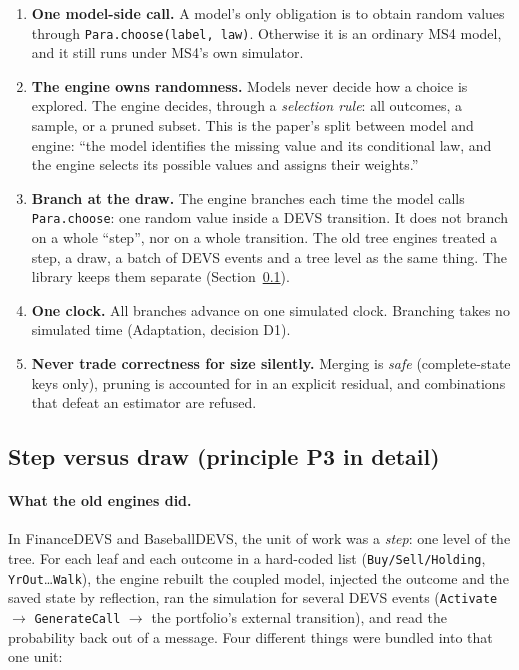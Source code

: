 \documentclass[11pt]{article}
\newcommand{\code}[1]{\texttt{#1}}
\begin{document}
\begin{enumerate}[label=\textbf{P\arabic*.}]
\item \textbf{One model-side call.} A model's only obligation is to obtain random values through
  \code{Para.choose(label, law)}. Otherwise it is an ordinary MS4 model, and it still runs under MS4's own simulator.
\item \textbf{The engine owns randomness.} Models never decide how a choice is explored. The engine decides,
  through a \emph{selection rule}: all outcomes, a sample, or a pruned subset. This is the paper's split between model
  and engine: ``the model identifies the missing value and its conditional law, and the engine selects its possible
  values and assigns their weights.''
\item \textbf{Branch at the draw.} The engine branches each time the model calls \code{Para.choose}: one random value
  inside a DEVS transition. It does not branch on a whole ``step'', nor on a whole transition. The old tree engines
  treated a step, a draw, a batch of DEVS events and a tree level as the same thing. The library keeps them separate
  (Section~\ref{sec:stepdraw}).
\item \textbf{One clock.} All branches advance on one simulated clock. Branching takes no simulated time
  (Adaptation, decision D1).
\item \textbf{Never trade correctness for size silently.} Merging is \emph{safe} (complete-state keys only),
  pruning is accounted for in an explicit residual, and combinations that defeat an estimator are refused.
\end{enumerate}

\subsection{Step versus draw (principle P3 in detail)}
\label{sec:stepdraw}

\paragraph{What the old engines did.} In FinanceDEVS and BaseballDEVS, the unit of work was a \emph{step}: one level
of the tree. For each leaf and each outcome in a hard-coded list (\code{Buy/Sell/Holding}, \code{YrOut}\dots\code{Walk}),
the engine rebuilt the coupled model, injected the outcome and the saved state by reflection, ran the simulation for
several DEVS events (\code{Activate} $\to$ \code{GenerateCall} $\to$ the portfolio's external transition), and read the
probability back out of a message. Four different things were bundled into that one unit:
\end{document}
